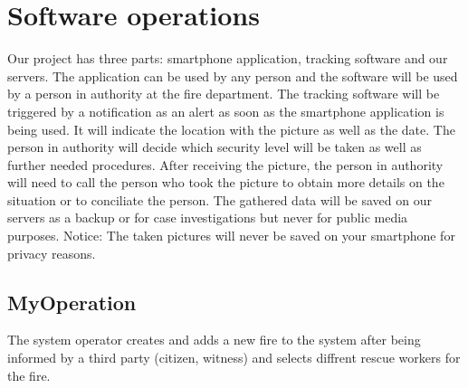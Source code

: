 \chapter{Software operations}
\label{chap:soptware_operations}


Our project has three parts: smartphone application, tracking software and our
servers. The application can be used by any person and the software will be used
by a person in authority at the fire department. The tracking software will be
triggered by a notification as an alert as soon as the smartphone application is
being used. It will indicate the location with the picture as well as the date.
The person in authority will decide which security level will be taken as well
as further needed procedures. After receiving the picture, the person in
authority will need to call the person who took the picture to obtain more
details on the situation or to conciliate the person. The gathered data will be
saved on our servers as a backup or for case investigations but never for public
media purposes. Notice: The taken pictures will never be saved on your
smartphone for privacy reasons.


\section{MyOperation}
\label{operation:MyOperation}
The system operator creates and adds a new fire to the system after being
informed by a third party (citizen, witness) and selects diffrent rescue workers
for the fire.


